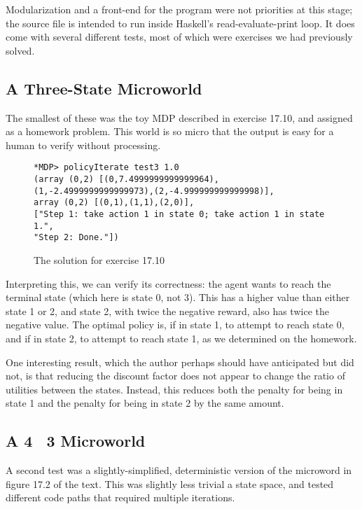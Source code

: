 \documentclass[paper=letter,pagesize=automedia,twoside=false,12pt]{scrartcl}
\theoremstyle{plain}%
\theoremstyle{definition}
\theoremstyle{remark}
\begin{document}
Modularization and a front-end for the program were not priorities at this stage; the source file is intended to run inside Haskell's read-evaluate-print loop.  It does come with several different tests, most of which were exercises we had previously solved.

\subsection{A Three-State Microworld}\label{sec:test3}

The smallest of these was the toy MDP described in exercise 17.10, and assigned as a homework problem.  This world is so micro that the output is easy for a human to verify without processing.

\begin{figure}[h!]\label{fig:sol-tests}
\caption{The solution for exercise 17.10}
\begin{verbatim}
*MDP> policyIterate test3 1.0
(array (0,2) [(0,7.4999999999999964),(1,-2.4999999999999973),(2,-4.999999999999998)],
array (0,2) [(0,1),(1,1),(2,0)],
["Step 1: take action 1 in state 0; take action 1 in state 1.",
"Step 2: Done."])
\end{verbatim}
\end{figure}

Interpreting this, we can verify its correctness: the agent wants to reach the terminal state (which here is state 0, not 3).  This has a higher value than either state 1 or 2, and state 2, with twice the negative reward, also has twice the negative value.  The optimal policy is, if in state 1, to attempt to reach state 0, and if in state 2, to attempt to reach state 1, as we determined on the homework.

One interesting result, which the author perhaps should have anticipated but did not, is that reducing the discount factor does not appear to change the ratio of utilities between the states.  Instead, this reduces both the penalty for being in state 1 and the penalty for being in state 2 by the same amount.

\subsection{A 4 \times~3 Microworld}\label{sec:test4x3}

A second test was a slightly-simplified, deterministic version of the microword in figure 17.2 of the text.  This was slightly less trivial a state space, and tested different code paths that required multiple iterations. 
\end{document}
